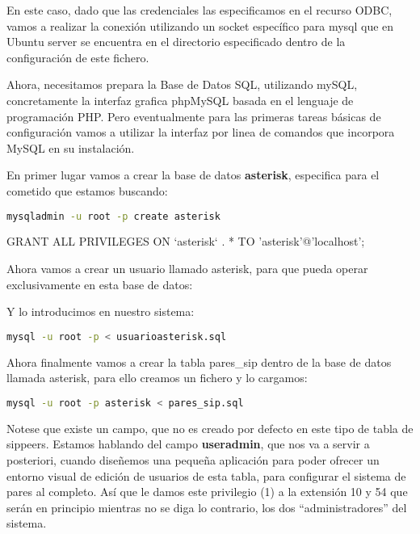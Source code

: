 En este caso, dado que las credenciales las especificamos en el recurso ODBC, vamos a realizar la conexión utilizando un socket específico para mysql que en Ubuntu server se encuentra en el directorio especificado dentro de la configuración de este fichero.

Ahora, necesitamos prepara la Base de Datos SQL, utilizando mySQL, concretamente la interfaz grafica phpMySQL basada en el lenguaje de programación PHP. Pero eventualmente para las primeras tareas básicas de configuración vamos a utilizar la interfaz por linea de comandos que incorpora MySQL en su instalación.

En primer lugar vamos a crear la base de datos \textbf{asterisk}, especifica para el cometido que estamos buscando:

\begin{lstlisting}[language=sh]
mysqladmin -u root -p create asterisk
\end{lstlisting}

GRANT ALL PRIVILEGES ON `asterisk` . * TO 'asterisk'@'localhost';


Ahora vamos a crear un usuario llamado asterisk, para que pueda operar exclusivamente en esta base de datos:



Y lo introducimos en nuestro sistema:

\begin{lstlisting}[language=sh]
mysql -u root -p < usuarioasterisk.sql
\end{lstlisting}

Ahora finalmente vamos a crear la tabla pares\_sip dentro de la base de datos llamada asterisk, para ello creamos un fichero y lo cargamos:



\begin{lstlisting}[language=sh]
mysql -u root -p asterisk < pares_sip.sql
\end{lstlisting}

Notese que existe un campo, que no es creado por defecto en este tipo de tabla de sippeers. Estamos hablando del campo \textbf{useradmin}, que nos va a servir a posteriori, cuando diseñemos una pequeña aplicación para poder ofrecer un entorno visual de edición de usuarios de esta tabla, para configurar el sistema de pares al completo. Así que le damos este privilegio (1) a la extensión 10 y 54 que serán en principio mientras no se diga lo contrario, los dos ``administradores'' del sistema.

